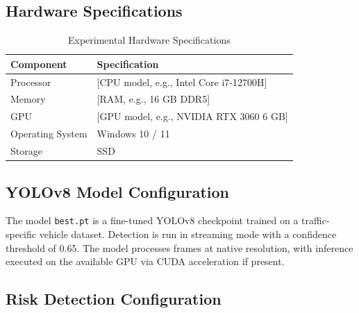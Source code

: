 \documentclass[12pt]{report}
\begin{document}
\subsection{Hardware Specifications}

\begin{table}[H]
    \centering
    \caption{Experimental Hardware Specifications}
    \label{tab:hardware}
    \begin{tabular}{ll}
        \toprule
        \textbf{Component} & \textbf{Specification} \\
        \midrule
        Processor & [CPU model, e.g., Intel Core i7-12700H] \\
        Memory & [RAM, e.g., 16 GB DDR5] \\
        GPU & [GPU model, e.g., NVIDIA RTX 3060 6 GB] \\
        Operating System & Windows 10 / 11 \\
        Storage & SSD \\
        \bottomrule
    \end{tabular}
\end{table}

\subsection{YOLOv8 Model Configuration}

The model \texttt{best.pt} is a fine-tuned YOLOv8 checkpoint trained on a traffic-specific vehicle dataset.
Detection is run in streaming mode with a confidence threshold of 0.65.
The model processes frames at native resolution, with inference executed on the available GPU via CUDA acceleration if present.

\subsection{Risk Detection Configuration}
\end{document}
